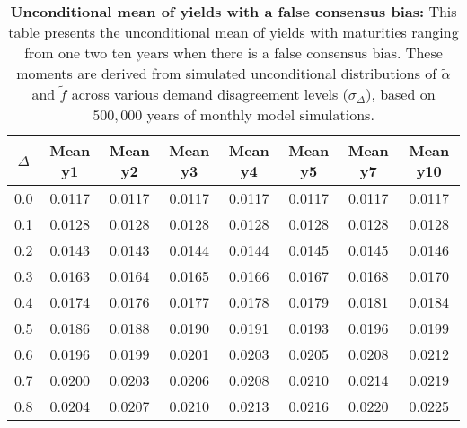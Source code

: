 \begin{table}[h!]
\centering
\caption{\textbf{Unconditional mean of yields with a false consensus bias:} This table presents the unconditional mean of yields with maturities ranging from one two ten years when there is a false consensus bias. These moments are derived from simulated unconditional distributions of $\tilde{\alpha}$ and $\tilde{f}$ across various demand disagreement levels ($\sigma_{\Delta}$), based on $500,000$ years of monthly model simulations.}
\begin{tabular}{c|ccccccc}
\hline
$\Delta$ & Mean y1 & Mean y2 & Mean y3 & Mean y4 & Mean y5 & Mean y7 & Mean y10 \\
\hline
0.0 & 0.0117 & 0.0117 & 0.0117 & 0.0117 & 0.0117 & 0.0117 & 0.0117 \\
0.1 & 0.0128 & 0.0128 & 0.0128 & 0.0128 & 0.0128 & 0.0128 & 0.0128 \\
0.2 & 0.0143 & 0.0143 & 0.0144 & 0.0144 & 0.0145 & 0.0145 & 0.0146 \\
0.3 & 0.0163 & 0.0164 & 0.0165 & 0.0166 & 0.0167 & 0.0168 & 0.0170 \\
0.4 & 0.0174 & 0.0176 & 0.0177 & 0.0178 & 0.0179 & 0.0181 & 0.0184 \\
0.5 & 0.0186 & 0.0188 & 0.0190 & 0.0191 & 0.0193 & 0.0196 & 0.0199 \\
0.6 & 0.0196 & 0.0199 & 0.0201 & 0.0203 & 0.0205 & 0.0208 & 0.0212 \\
0.7 & 0.0200 & 0.0203 & 0.0206 & 0.0208 & 0.0210 & 0.0214 & 0.0219 \\
0.8 & 0.0204 & 0.0207 & 0.0210 & 0.0213 & 0.0216 & 0.0220 & 0.0225 \\
\hline
\end{tabular}
\end{table}

